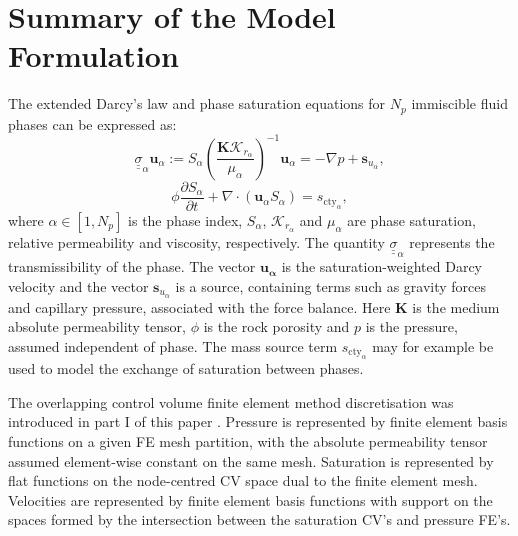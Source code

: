 \documentclass[preprint,authoryear,12pt]{elsarticle}
\begin{document}
\section{Summary of the Model Formulation}\label{Section:SummaryPaper1}
The extended Darcy's law and phase saturation equations for $N_{p}$
immiscible fluid phases can be expressed as:
\begin{equation}
  \underline{\underline{\sigma}}_{\alpha} \mathbf{u}_{\alpha} :=
  S_{\alpha}\left(\displaystyle\frac{\mathbf{K}
    \mathcal{K}_{r_\alpha}}{\mu_{\alpha}}\right)^{-1}\mathbf{u}_{\alpha}=
  -\nabla p + \mathbf{s}_{u_\alpha},
  \label{Darcy}
\end{equation}
\begin{equation}\label{Eqn:Saturation}
  \phi\displaystyle\frac{\partial S_{\alpha} }{\partial t} + \nabla
  \cdot \left( {\mathbf u}_{\alpha} S_{\alpha}\right) =
  s_{\mbox{cty}_\alpha},
\end{equation}
where $\alpha\in\left[1,N_{p}\right]$ is the phase index, $S_\alpha$,
$\mathcal{K}_{r_\alpha}$ and $\mu_\alpha$ are phase saturation,
relative permeability and viscosity, respectively. The quantity
$\underline{\underline{\sigma}}_{\alpha}$ represents the
transmissibility of the phase. The vector $\mathbf{u_\alpha}$ is the
saturation-weighted Darcy velocity and the vector
$\mathbf{s}_{u_\alpha}$ is a source, containing terms such as gravity
forces and capillary pressure, associated with the force balance. Here
$\mathbf{K}$ is the medium absolute permeability tensor, $\phi$ is the
rock porosity and $p$ is the pressure, assumed independent of
phase. The mass source term $s_{\mbox{cty}_\alpha}$ may for example be
used to model the exchange of saturation between phases.

The overlapping control volume finite element method discretisation
was introduced in part I of this paper \citep{gomes_2013}. Pressure
is represented by finite element basis functions on a given FE mesh
partition, with the absolute permeability tensor assumed element-wise
constant on the same mesh. Saturation is represented by flat functions
on the node-centred CV space dual to the finite element
mesh. Velocities are represented by finite element basis functions
with support on the spaces formed by the intersection between the
saturation CV's and pressure FE's.
\end{document}
